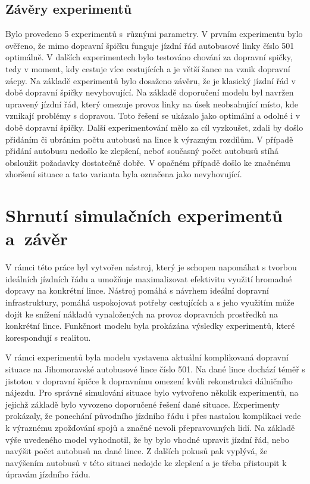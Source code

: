 \documentclass[a4paper]{article}
\begin{document}
        \subsection{Závěry experimentů}
        \label{subsec:experiments_summary}

            Bylo provedeno 5 experimentů s~různými parametry. V prvním experimentu bylo ověřeno, že mimo dopravní špičku funguje jízdní řád autobusové linky číslo 501 optimálně. V dalších experimentech bylo testováno chování za dopravní spičky, tedy v moment, kdy cestuje více cestujících a je větší šance na vznik dopravní zácpy. Na základě experimentů bylo dosaženo závěru, že je klasický jízdní řád v době dopravní špičky nevyhovující. Na základě doporučení modelu byl navržen upravený jízdní řád, který omezuje provoz linky na úsek neobsahující místo, kde vznikají problémy s dopravou. Toto řešení se ukázalo jako optimální a odolné i v době dopravní špičky. Další experimentování mělo za cíl vyzkoušet, zdali by došlo přidáním či ubráním počtu autobusů na lince k výrazným rozdílům. V případě přidání autobusu nedošlo ke zlepšení, neboť současný počet autobusů stíhá obsloužit požadavky dostatečně dobře. V opačném případě došlo ke značnému zhoršení situace a tato varianta byla označena jako nevyhovující.
            
\newpage
    \section{Shrnutí simulačních experimentů a~závěr}
    \label{sec:summary}
    		V rámci této práce byl vytvořen nástroj, který je schopen napomáhat s tvorbou ideálních jízdních řádu a umožňuje maximalizovat efektivitu využití hromadné dopravy na konkrétní lince. Nástroj pomáhá s návrhem ideální dopravní infrastruktury, pomáhá uspokojovat potřeby cestujících a s jeho využitím může dojít ke snížení nákladů vynaložených na provoz dopravních prostředků na konkrétní lince. Funkčnost modelu byla prokázána výsledky experimentů, které korespondují s realitou.
  
    
    		V rámci experimentů byla modelu vystavena aktuální komplikovaná dopravní situace na Jihomoravské autobusové lince číslo 501. Na dané lince dochází téměř s jistotou v dopravní špičce k dopravnímu omezení kvůli rekonstrukci dálničního nájezdu. Pro správné simulování situace bylo vytvořeno několik experimentů, na jejichž základě bylo vyvozeno doporučené řešení dané situace.
            Experimenty prokázaly, že ponechání původního jízdního řádu i přes nastalou komplikaci vede k výraznému zpožďování spojů a značné nevoli přepravovaných lidí. Na základě výše uvedeného model vyhodnotil, že by bylo vhodné upravit jízdní řád, nebo navýšit počet autobusů na dané lince. Z dalších pokusů pak vyplývá, že navýšením autobusů v této situaci nedojde ke zlepšení a je třeba přistoupit k úpravám jízdního řádu.
            
\end{document}
